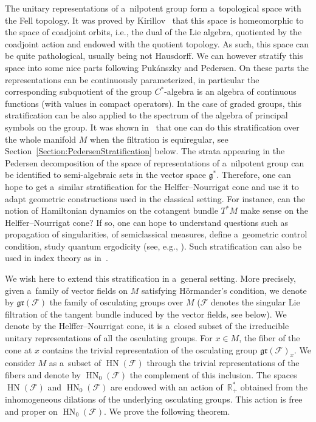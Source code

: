 \documentclass[10pt,a4paper]{article}
\newcommand{\R}{\mathbb R} %
\newcommand{\F}{\mathcal{F}} %
\newcommand{\g}{\mathfrak{g}} %
\newcommand{\HN}{\operatorname{HN}} %
\newcommand{\gr}{\mathfrak{gr}} %
\numberwithin{equation}{section}
\theoremstyle{definition}
\begin{document}
The unitary representations of a~nilpotent group form a~topological space with the Fell topology. It was proved by Kirillov~\cite{Kirillov} that this space is homeomorphic to the space of coadjoint orbits, i.e., the dual of the Lie algebra, quotiented by the coadjoint action and endowed with the quotient topology. As such, this space can be quite pathological, usually being not Hausdorff. We can however stratify this space into some nice parts following Puk\'anszky and Pedersen. On these parts the representations can be continuously parameterized, in particular the corresponding subquotient of the group $C^*$-algebra is an algebra of continuous functions (with values in compact operators). In the case of graded groups, this stratification can be also applied to the spectrum of the algebra of principal symbols on the group. It was shown in~\cite{CrenFilteredCrossedProduct} that one can do this stratification over the whole manifold $M$ when the filtration is equiregular, see Section~\ref{Section:PedersenStratification} below. The strata appearing in the Pedersen decomposition of the space of representations of a~nilpotent group can be identified to semi-algebraic sets in the vector space $\g^*$. Therefore, one can hope to get a~similar stratification for the Helffer--Nourrigat cone and use it to adapt geometric constructions used in the classical setting. For instance, can the notion of Hamiltonian dynamics on the cotangent bundle $T^*M$ make sense on the Helffer--Nourrigat cone? If so, one can hope to understand questions such as propagation of singularities, of semiclassical measures, define a~geometric control condition, study quantum ergodicity (see, e.g., \cite{benedetto}). Such stratification can also be used in index theory as in~\cite{GoffengKuzmin}.

We wish here to extend this stratification in a~general setting. More precisely, given a~family of vector fields on $M$ satisfying H\"ormander's condition, we denote by $\gr(\F)$ the family of osculating groups over $M$ ($\F$ denotes the singular Lie filtration of the tangent bundle induced by the vector fields, see below). We denote by \smash{$\HN(\F) \subset \widehat{\gr(\F)}$} the Helffer--Nourrigat cone, it is a~closed subset of the irreducible unitary representations of all the osculating groups. For $x \in M$, the fiber of the cone at $x$ contains the trivial representation of the osculating group $\gr(\F)_x$. We consider $M$ as a~subset of $\HN(\F)$ through the trivial representations of the fibers and denote by $\HN_0(\F)$ the complement of this inclusion. The spaces $\HN( \F)$ and $\HN_0(\F)$ are endowed with an action of~$\R^*_+$ obtained from the inhomogeneous dilations of the underlying osculating groups. This action is free and proper on $\HN_0(\F)$. We prove the following theorem.
\end{document}
